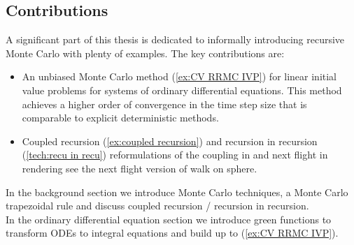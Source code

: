 \documentclass[a4paper,12pt]{article}
\begin{document}





\subsection{Contributions}
A significant part of this thesis is dedicated to informally introducing recursive Monte Carlo
with plenty of examples. The key contributions are:

\begin{itemize}
    \item An unbiased Monte Carlo method (\ref{ex:CV RRMC IVP}) for
          linear initial value problems for systems of ordinary
          differential equations. This method achieves a higher order of convergence
          in the time step size that is comparable to explicit deterministic methods.
    \item Coupled recursion (\ref{ex:coupled recursion}) and
          recursion in recursion (\ref{tech:recu in recu}) reformulations of the coupling in
          \cite{vicini_path_2021} and next flight in rendering see \cite{sawhney_grid-free_2022}
          the next flight version of walk on sphere.
\end{itemize}

In the background section we introduce Monte Carlo techniques, a
Monte Carlo trapezoidal rule and discuss
coupled recursion / recursion in recursion. \\

In the ordinary differential equation section we introduce green functions
to transform ODEs to integral equations and
build up to (\ref{ex:CV RRMC IVP}). \\
\end{document}
